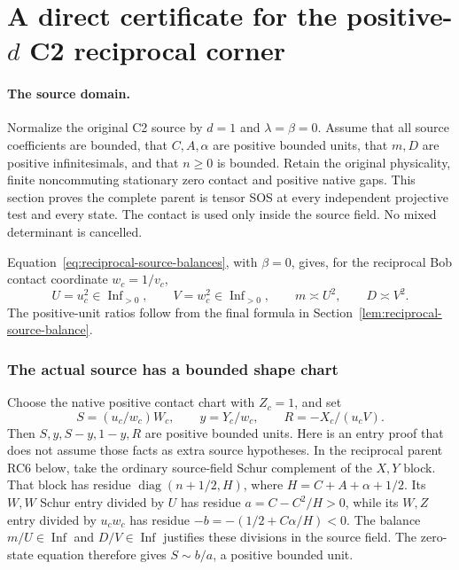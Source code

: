 \section{\texorpdfstring{A direct certificate for the positive-$d$ C2 reciprocal corner}{A direct certificate for the positive-d C2 reciprocal corner}}
\label{component:p10686597065a}

\label{p10686597065a:sec:new-rc-direct}

\paragraph{The source domain.}
Normalize the original C2 source by $d=1$ and $\lambda=\beta=0$.
Assume that all source coefficients are bounded, that $C,A,\alpha$
are positive bounded units, that $m,D$ are positive infinitesimals,
and that $n\geq0$ is bounded. Retain the original physicality,
finite noncommuting stationary zero contact and positive native gaps. This section proves
the complete parent is tensor SOS at every independent projective
test and every state. The contact is used only inside the source
field. No mixed determinant is cancelled.

Equation~\eqref{eq:reciprocal-source-balances}, with $\beta=0$,
gives, for the reciprocal Bob contact coordinate $w_c=1/v_c$,
\[
 U=u_c^2\in\operatorname{Inf}_{>0},\qquad
 V=w_c^2\in\operatorname{Inf}_{>0},\qquad
 m\asymp U^2,\qquad D\asymp V^2.
 \tag{RC1}
\]
The positive-unit ratios follow from the final formula in
Section~\ref{lem:reciprocal-source-balance}.

\subsubsection*{The actual source has a bounded shape chart}

Choose the native positive contact chart with $Z_c=1$, and set
\[
 S=(u_c/w_c)W_c,\qquad y=Y_c/w_c,\qquad
 R=-X_c/(u_cV).
 \tag{RC2}
\]
Then $S,y,S-y,1-y,R$ are positive bounded units. Here is an entry
proof that does not assume those facts as extra source hypotheses.
In the reciprocal parent RC6 below, take the ordinary source-field
Schur complement of the $X,Y$ block. That block has residue
$\operatorname{diag}(n+1/2,H)$, where $H=C+A+\alpha+1/2$.
Its $W,W$ Schur entry divided by $U$ has residue
$a=C-C^2/H>0$, while its $W,Z$ entry divided by $u_cw_c$
has residue $-b=-(1/2+C\alpha/H)<0$. The balance
$m/U\in\operatorname{Inf}$ and $D/V\in\operatorname{Inf}$
justifies these divisions in the source field. The zero-state
equation therefore gives $S\sim b/a$, a positive bounded unit.

